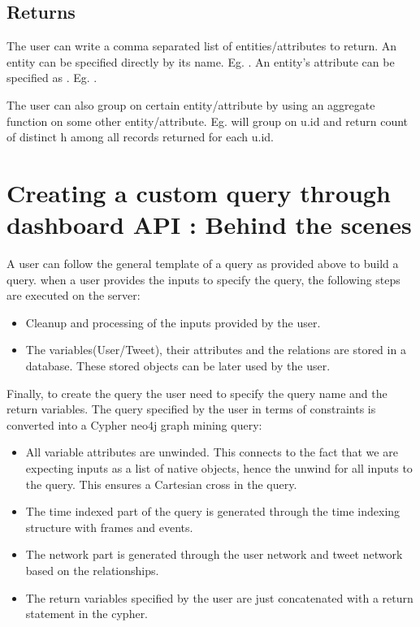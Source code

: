 \documentclass[letterpaper,10pt,english]{sphinxmanual}
\begin{document}
\subsection{Returns}
\label{\detokenize{neo4j_query_generation:returns}}
The user can write a comma separated list of entities/attributes to return. An entity can be specified directly by its name. Eg. . An entity’s attribute can be specified as . Eg. .

The user can also group on certain entity/attribute by using an aggregate function on some other entity/attribute. Eg.  will group on u.id and return count of distinct h among all records returned for each u.id.


\section{Creating a custom query through dashboard API : Behind the scenes}
\label{\detokenize{neo4j_query_generation:creating-a-custom-query-through-dashboard-api-behind-the-scenes}}
A user can follow the general template of a query as provided above to build a query.
when a user provides the inputs to specify the query, the following steps are executed on the server:
\begin{itemize}
\item {} 
Cleanup and processing of the inputs provided by the user.

\item {} 
The variables(User/Tweet), their attributes and the relations are stored in a database. These stored objects can be later used by the user.

\end{itemize}

Finally, to create the query the user need to specify the query name and the return variables. The query specified by the user in terms of constraints is converted into a Cypher neo4j graph mining query:
\begin{itemize}
\item {} 
All variable attributes are unwinded. This connects to the fact that we are expecting inputs as a list of native objects, hence the unwind for all inputs to the query. This ensures a Cartesian cross in the query.

\item {} 
The time indexed part of the query is generated through the time indexing structure with frames and events.

\item {} 
The network part is generated through the user network and tweet network based on the relationships.

\item {} 
The return variables specified by the user are just concatenated with a return statement in the cypher.

\end{itemize}
\end{document}
